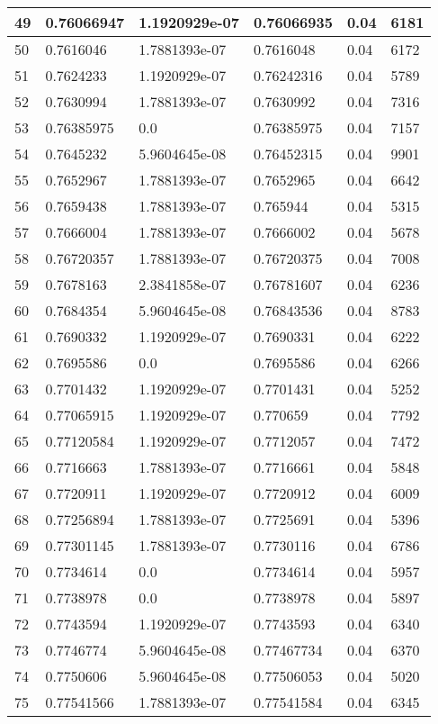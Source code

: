 \begin{longtable}{|l|l|l|l|l|l|}
49 & 0.76066947 & 1.1920929e-07 & 0.76066935 & 0.04 & 6181 \\ \hline 
50 & 0.7616046 & 1.7881393e-07 & 0.7616048 & 0.04 & 6172 \\ \hline 
51 & 0.7624233 & 1.1920929e-07 & 0.76242316 & 0.04 & 5789 \\ \hline 
52 & 0.7630994 & 1.7881393e-07 & 0.7630992 & 0.04 & 7316 \\ \hline 
53 & 0.76385975 & 0.0 & 0.76385975 & 0.04 & 7157 \\ \hline 
54 & 0.7645232 & 5.9604645e-08 & 0.76452315 & 0.04 & 9901 \\ \hline 
55 & 0.7652967 & 1.7881393e-07 & 0.7652965 & 0.04 & 6642 \\ \hline 
56 & 0.7659438 & 1.7881393e-07 & 0.765944 & 0.04 & 5315 \\ \hline 
57 & 0.7666004 & 1.7881393e-07 & 0.7666002 & 0.04 & 5678 \\ \hline 
58 & 0.76720357 & 1.7881393e-07 & 0.76720375 & 0.04 & 7008 \\ \hline 
59 & 0.7678163 & 2.3841858e-07 & 0.76781607 & 0.04 & 6236 \\ \hline 
60 & 0.7684354 & 5.9604645e-08 & 0.76843536 & 0.04 & 8783 \\ \hline 
61 & 0.7690332 & 1.1920929e-07 & 0.7690331 & 0.04 & 6222 \\ \hline 
62 & 0.7695586 & 0.0 & 0.7695586 & 0.04 & 6266 \\ \hline 
63 & 0.7701432 & 1.1920929e-07 & 0.7701431 & 0.04 & 5252 \\ \hline 
64 & 0.77065915 & 1.1920929e-07 & 0.770659 & 0.04 & 7792 \\ \hline 
65 & 0.77120584 & 1.1920929e-07 & 0.7712057 & 0.04 & 7472 \\ \hline 
66 & 0.7716663 & 1.7881393e-07 & 0.7716661 & 0.04 & 5848 \\ \hline 
67 & 0.7720911 & 1.1920929e-07 & 0.7720912 & 0.04 & 6009 \\ \hline 
68 & 0.77256894 & 1.7881393e-07 & 0.7725691 & 0.04 & 5396 \\ \hline 
69 & 0.77301145 & 1.7881393e-07 & 0.7730116 & 0.04 & 6786 \\ \hline 
70 & 0.7734614 & 0.0 & 0.7734614 & 0.04 & 5957 \\ \hline 
71 & 0.7738978 & 0.0 & 0.7738978 & 0.04 & 5897 \\ \hline 
72 & 0.7743594 & 1.1920929e-07 & 0.7743593 & 0.04 & 6340 \\ \hline 
73 & 0.7746774 & 5.9604645e-08 & 0.77467734 & 0.04 & 6370 \\ \hline 
74 & 0.7750606 & 5.9604645e-08 & 0.77506053 & 0.04 & 5020 \\ \hline 
75 & 0.77541566 & 1.7881393e-07 & 0.77541584 & 0.04 & 6345 \\ \hline 
\end{longtable}
